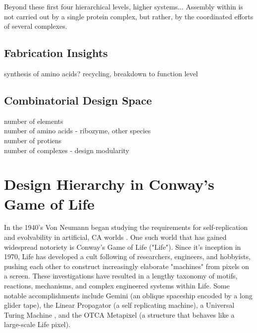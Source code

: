 {Beyond these first four hierarchical levels, higher systems...
Assembly within is not carried out by a single protein complex, but rather, by the coordinated efforts of several complexes.

\subsection{Fabrication Insights}

synthesis of amino acids? recycling, breakdown to function level

\subsection{Combinatorial Design Space}

number of elements\\
number of amino acids - ribozyme, other species\\
number of protiens\\
number of complexes - design modularity\\

\section{Design Hierarchy in Conway's Game of Life}

In the 1940's Von Neumann began studying the requirements for self-replication and evolvability in artificial, CA worlds \cite{Neumann1966}.  One such world that has gained widespread notoriety is Conway's Game of Life ("Life").  Since it's inception in 1970, Life has developed a cult following of researchers, engineers, and hobbyists, pushing each other to construct increasingly elaborate "machines" from pixels on a screen.  These investigations have resulted in a lengthy taxonomy of motifs, reactions, mechanisms, and complex engineered systems within Life.  Some notable accomplishments include Gemini (an oblique spaceship encoded by a long glider tape)\cite{Wade2010}, the Linear Propagator (a self replicating machine)\cite{Greene2013}, a Universal Turing Machine \cite{Rendell2000}, and the OTCA Metapixel (a structure that behaves like a large-scale Life pixel)\cite{Due2006}.\\

}

